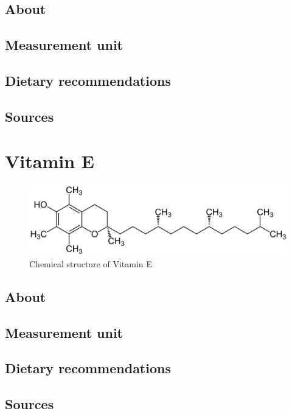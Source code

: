 \documentclass{book}
\begin{document}
\section{About}


\section{Measurement unit}


\section{Dietary recommendations}


\section{Sources}


\chapter{Vitamin E}
\begin{figure}[h]
	\centering \includegraphics[width=0.75\linewidth]{images/Vitamin_E_chemical_structure}
	\caption{Chemical structure of Vitamin E}
\end{figure}

\section{About}


\section{Measurement unit}


\section{Dietary recommendations}


\section{Sources}
\end{document}
